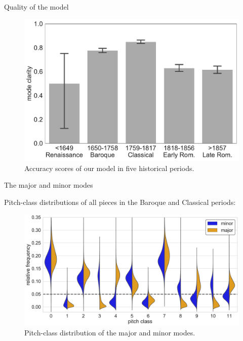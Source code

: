 \begin{frame}{Quality of the model}
    \begin{figure}
        \centering
        \includegraphics[width=\linewidth,height=.7\textheight,keepaspectratio]{_images/Figure5.pdf}
        \caption{Accuracy scores of our model in five historical periods.}
    \end{figure}
\end{frame}

\begin{frame}{The major and minor modes}

    Pitch-class distributions of all pieces in the Baroque and Classical periods:

    \begin{figure}
        \centering
        \includegraphics[width=\linewidth,height=.7\textheight,keepaspectratio]{_images/Figure8.pdf}
        \caption{Pitch-class distribution of the major and minor modes.}
    \end{figure}
\end{frame}

